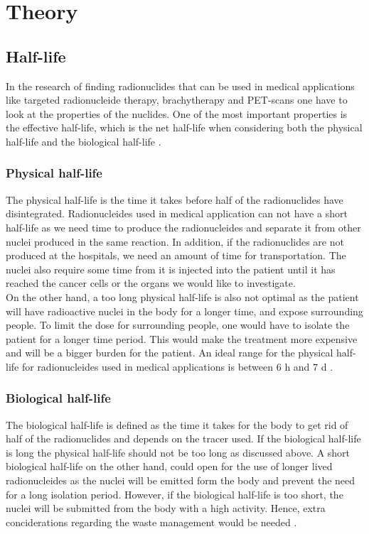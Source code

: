 \chapter{Theory}
\label{theory}
\section{Half-life}
In the research of finding radionuclides that can be used in medical applications like targeted radionucleide therapy, brachytherapy and PET-scans one have to look at the properties of the nuclides. One of the most important properties is the effective half-life, which is the net half-life when considering both the physical half-life and the biological half-life \cite{yeongTherapeuticRadionuclidesNuclear2014a}.

\subsection{Physical half-life}
The physical half-life is the time it takes before half of the radionuclides have disintegrated. Radionucleides used in medical application can not have a short half-life as we need time to produce the radionucleides and separate it from other nuclei produced in the same reaction. In addition, if the radionuclides are not produced at the hospitals, we need an amount of time for transportation. The nuclei also require some time from it is injected into the patient until it has reached the cancer cells or the organs we would like to investigate. 
\vspace{3mm}
\\
On the other hand, a too long physical half-life is also not optimal as the patient will have radioactive nuclei in the body for a longer time, and expose surrounding people. To limit the dose for surrounding people, one would have to isolate the patient for a longer time period. This would make the treatment more expensive and will be a bigger burden for the patient. An ideal range for the physical half-life for radionucleides used in medical applications is between $6$ h and $7$ d \cite{yeongTherapeuticRadionuclidesNuclear2014a}.

\subsection{Biological half-life}
The biological half-life is defined as the time it takes for the body to get rid of half of the radionuclides and depends on the tracer used. If the biological half-life is long the physical half-life should not be too long as discussed above. A short biological half-life on the other hand, could open for the use of longer lived radionucleides as the nuclei will be emitted form the body and prevent the need for a long isolation period. However, if the biological half-life is too short, the nuclei will be submitted from the body with a high activity. Hence, extra conciderations regarding the waste management would be needed \cite{yeongTherapeuticRadionuclidesNuclear2014a}.



